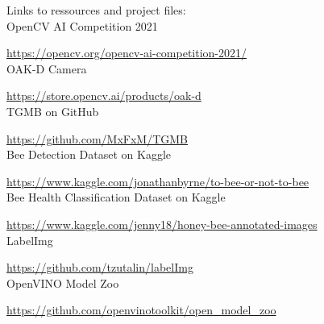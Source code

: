 \documentclass[a4paper,titlepage]{article}
\begin{document}
Links to ressources and project files: \\

OpenCV AI Competition 2021

\href{https://opencv.org/opencv-ai-competition-2021/}{https://opencv.org/opencv-ai-competition-2021/} \\

OAK-D Camera

\href{https://store.opencv.ai/products/oak-d}{https://store.opencv.ai/products/oak-d} \\

TGMB on GitHub

\href{https://github.com/MxFxM/TGMB}{https://github.com/MxFxM/TGMB} \\

Bee Detection Dataset on Kaggle

\href{https://www.kaggle.com/jonathanbyrne/to-bee-or-not-to-bee}{https://www.kaggle.com/jonathanbyrne/to-bee-or-not-to-bee} \\

Bee Health Classification Dataset on Kaggle

\href{https://www.kaggle.com/jenny18/honey-bee-annotated-images}{https://www.kaggle.com/jenny18/honey-bee-annotated-images} \\

LabelImg

\href{https://github.com/tzutalin/labelImg}{https://github.com/tzutalin/labelImg} \\

OpenVINO Model Zoo

\href{https://github.com/openvinotoolkit/open_model_zoo}{https://github.com/openvinotoolkit/open\_model\_zoo} \\
\end{document}
